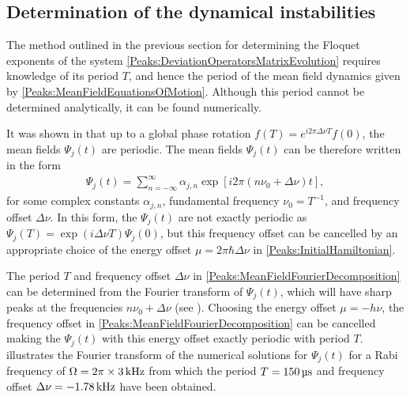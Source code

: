 \subsection{Determination of the dynamical instabilities}
\label{Peaks:ExperimentEigenvalues}

The method outlined in the previous section for determining the Floquet exponents of the system \eqref{Peaks:DeviationOperatorsMatrixEvolution} requires knowledge of its period $T$, and hence the period of the mean field dynamics given by \eqref{Peaks:MeanFieldEquationsOfMotion}. Although this period cannot be determined analytically, it can be found numerically.

It was shown in  that up to a global phase rotation $\displaystyle f(T) = e^{i 2\pi \Delta \nu T}f(0)$, the mean fields $\Psi_j(t)$ are periodic. The mean fields $\Psi_j(t)$ can be therefore written in the form
\begin{align}
    \label{Peaks:MeanFieldFourierDecomposition}
    \Psi_j(t) = \sum_{n=-\infty}^\infty \alpha_{j,n} \exp\left[i 2\pi \left( n \nu_0 + \Delta\nu\right)t \right],
\end{align}
for some complex constants $\alpha_{j, n}$, fundamental frequency $\nu_0 = T^{-1}$, and frequency offset $\Delta \nu$. In this form, the $\Psi_j(t)$ are not exactly periodic as $\Psi_j(T) = \exp(i\Delta \nu T)\Psi_j(0)$, but this frequency offset can be cancelled by an appropriate choice of the energy offset $\mu = 2\pi\hbar \Delta \nu$ in \eqref{Peaks:InitialHamiltonian}.

The period $T$ and frequency offset $\Delta\nu$ in \eqref{Peaks:MeanFieldFourierDecomposition} can be determined from the Fourier transform of $\Psi_j(t)$, which will have sharp peaks at the frequencies $n \nu_0 + \Delta \nu$ (see ). Choosing the energy offset $\mu=-h \nu$, the frequency offset in \eqref{Peaks:MeanFieldFourierDecomposition} can be cancelled making the $\Psi_j(t)$ with this energy offset exactly periodic with period $T$.  illustrates the Fourier transform of the numerical solutions for $\Psi_j(t)$ for a Rabi frequency of $\Omega = 2 \pi \times \unit[3]{kHz}$ from which the period $T=\unit[150]{\micro{}s}$ and frequency offset $\Delta \nu = \unit[-1.78]{kHz}$ have been obtained.


